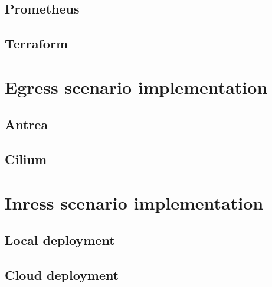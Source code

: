 \subsection{Prometheus}
\label{sec:prometheus}

\subsection{Terraform}
\label{sec:terraform}


\section{Egress scenario implementation}
\label{sec:egressImpl}
\subsection{Antrea}
\label{sec:antreaEgress}

\subsection{Cilium}
\label{sec:ciliumEgress}


\section{Inress scenario implementation}
\label{sec:ingressImpl}

\subsection{Local deployment}
\label{sec:localIngressImpl}

\subsection{Cloud deployment}
\label{sec:cloudIngressImpl}


